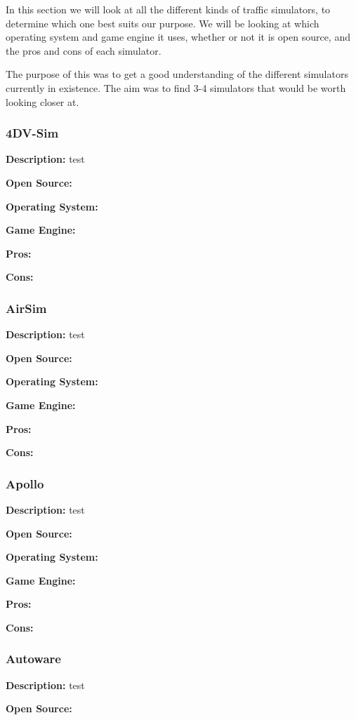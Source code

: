 In this section we will look at all the different kinds of traffic simulators, to determine which one best suits our purpose. We will be looking at which operating system and game engine it uses, whether or not it is open source, and the pros and cons of each simulator. 

The purpose of this was to get a good understanding of the different simulators currently in existence. The aim was to find 3-4 simulators that would be worth looking closer at.

\subsubsection{4DV-Sim}
\textbf{Description:} test

\textbf{Open Source:}

\textbf{Operating System:}

\textbf{Game Engine:}

\textbf{Pros:}

\textbf{Cons:}


\subsubsection{AirSim}
\textbf{Description:} test

\textbf{Open Source:}

\textbf{Operating System:}

\textbf{Game Engine:}

\textbf{Pros:}

\textbf{Cons:}


\subsubsection{Apollo}
\textbf{Description:} test

\textbf{Open Source:}

\textbf{Operating System:}

\textbf{Game Engine:}

\textbf{Pros:}

\textbf{Cons:}


\subsubsection{Autoware}
\textbf{Description:} test

\textbf{Open Source:}

